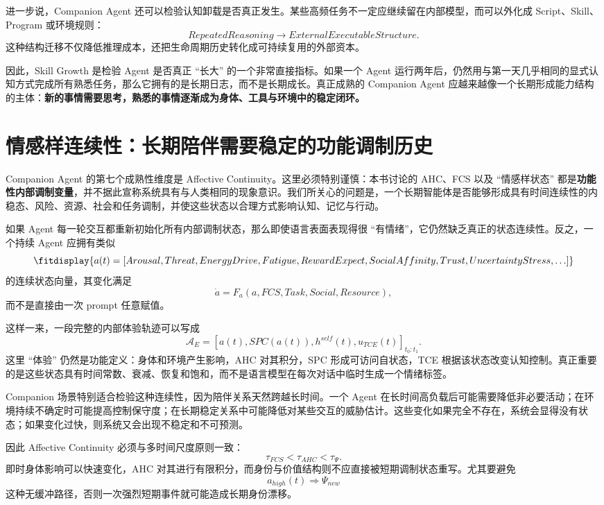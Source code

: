 进一步说，Companion Agent 还可以检验认知卸载是否真正发生。某些高频任务不一定应继续留在内部模型，而可以外化成 Script、Skill、Program 或环境规则：
\[
RepeatedReasoning
\rightarrow
ExternalExecutableStructure.
\]
这种结构迁移不仅降低推理成本，还把生命周期历史转化成可持续复用的外部资本。

因此，Skill Growth 是检验 Agent 是否真正 ``长大'' 的一个非常直接指标。如果一个 Agent 运行两年后，仍然用与第一天几乎相同的显式认知方式完成所有熟悉任务，那么它拥有的是长期日志，而不是长期成长。真正成熟的 Companion Agent 应越来越像一个长期形成能力结构的主体：\textbf{新的事情需要思考，熟悉的事情逐渐成为身体、工具与环境中的稳定闭环。}

\section{情感样连续性：长期陪伴需要稳定的功能调制历史}

Companion Agent 的第七个成熟性维度是 Affective Continuity。这里必须特别谨慎：本书讨论的 AHC、FCS 以及 ``情感样状态'' 都是\textbf{功能性内部调制变量}，并不据此宣称系统具有与人类相同的现象意识。我们所关心的问题是，一个长期智能体是否能够形成具有时间连续性的内稳态、风险、资源、社会和任务调制，并使这些状态以合理方式影响认知、记忆与行动。

如果 Agent 每一轮交互都重新初始化所有内部调制状态，那么即使语言表面表现得很 ``有情绪''，它仍然缺乏真正的状态连续性。反之，一个持续 Agent 应拥有类似
\[
\fitdisplay{
a(t)
=
[
Arousal,
Threat,
EnergyDrive,
Fatigue,
RewardExpect,
SocialAffinity,
Trust,
UncertaintyStress,\ldots]
}
\]
的连续状态向量，其变化满足
\[
\dot a
=
F_a
\left(
a,FCS,Task,Social,Resource
\right),
\]
而不是直接由一次 prompt 任意赋值。

这样一来，一段完整的内部体验轨迹可以写成
\[
\mathcal A_E
=
\left[
a(t),
SPC(a(t)),
h^{self}(t),
u_{TCE}(t)
\right]_{t_0:t_1}.
\]
这里 ``体验'' 仍然是功能定义：身体和环境产生影响，AHC 对其积分，SPC 形成可访问自状态，TCE 根据该状态改变认知控制。真正重要的是这些状态具有时间常数、衰减、恢复和饱和，而不是语言模型在每次对话中临时生成一个情绪标签。

Companion 场景特别适合检验这种连续性，因为陪伴关系天然跨越长时间。一个 Agent 在长时间高负载后可能需要降低非必要活动；在环境持续不确定时可能提高控制保守度；在长期稳定关系中可能降低对某些交互的威胁估计。这些变化如果完全不存在，系统会显得没有状态；如果变化过快，则系统又会出现不稳定和不可预测。

因此 Affective Continuity 必须与多时间尺度原则一致：
\[
\tau_{FCS}
<
\tau_{AHC}
<
\tau_{\Psi}.
\]
即时身体影响可以快速变化，AHC 对其进行有限积分，而身份与价值结构则不应直接被短期调制状态重写。尤其要避免
\[
a_{high}(t)
\Rightarrow
\Psi_{new}
\]
这种无缓冲路径，否则一次强烈短期事件就可能造成长期身份漂移。

